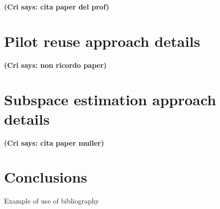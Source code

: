 \documentclass[11pt]{book}
\newcommand{\cri}[1]{\textcolor{MyColor2}{\textbf{(Cri says: #1)}}}
\begin{document}
\cri{cita paper del prof}
\section{Pilot reuse approach details}
\cri{non ricordo paper}
\section{Subspace estimation approach details}
\cri{cita paper muller}
\section{Conclusions}


Example of use of bibliography  \cite{Marzetta2010}





\end{document}
